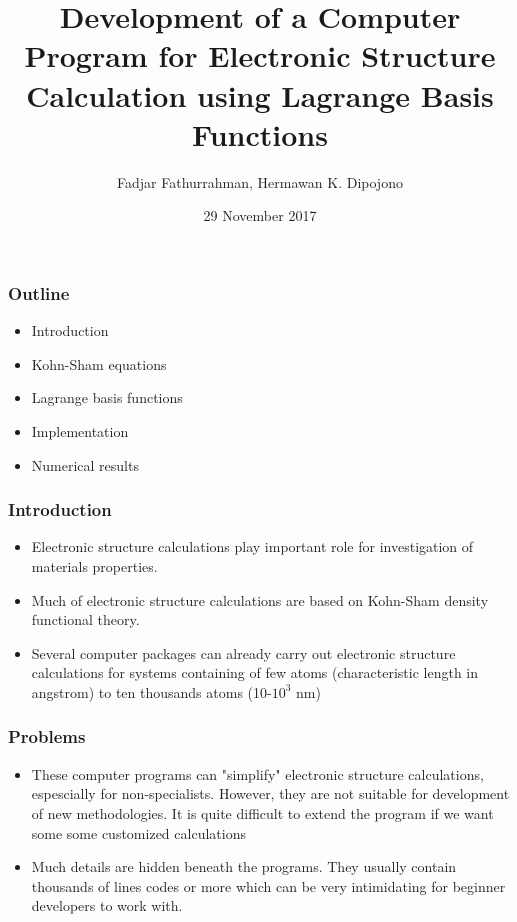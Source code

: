 \documentclass[10pt,t]{beamer}
\begin{document}
\title{Development of a Computer Program for Electronic Structure
Calculation using Lagrange Basis Functions}
\author{Fadjar Fathurrahman, Hermawan K. Dipojono}
\date{29 November 2017}

\frame{\titlepage}

\begin{frame}
\frametitle{Outline}

\begin{itemize}
\item Introduction
\item Kohn-Sham equations
\item Lagrange basis functions
\item Implementation
\item Numerical results
\end{itemize}

\end{frame}


\begin{frame}[c]
\frametitle{Introduction}

\begin{itemize}
\item Electronic structure calculations play important role for investigation of materials
properties.
\item Much of electronic structure calculations are based on Kohn-Sham density functional theory.
\item Several computer packages can already carry out electronic structure calculations
for systems containing of few atoms (characteristic length in angstrom) to ten thousands atoms
(10-$10^3$ nm)
\end{itemize}

\end{frame}


\begin{frame}[c]
\frametitle{Problems}

\begin{itemize}
\item These computer programs can "simplify" electronic structure calculations,
espescially for non-specialists.
However, they are not suitable for development of new methodologies.
It is quite difficult to extend the program if we want some some customized calculations
\item Much details are hidden beneath the programs. They usually contain thousands of lines codes
or more which can be very intimidating for beginner developers to work with.
\end{itemize}

\end{frame}
\end{document}
